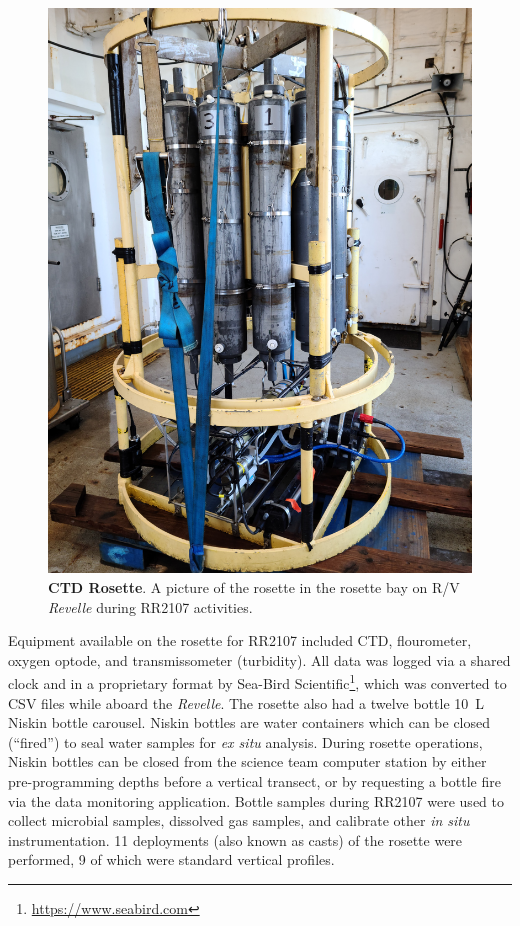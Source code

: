 \begin{figure}[h!]
  \centering
  \includegraphics[width=0.8\columnwidth, angle=-90]{figures/ops_rosette.jpg}
  \caption[CTD Rosette]{\textbf{CTD Rosette}. A picture of the rosette in the rosette bay on R/V \emph{Revelle} during RR2107 activities.}
  \label{fig:ops_rosette}
\end{figure}


Equipment available on the rosette for RR2107 included CTD, flourometer, oxygen optode, and transmissometer (turbidity). All data was logged via a shared clock and in a proprietary format by Sea-Bird Scientific\footnote{\url{https://www.seabird.com}}, which was converted to CSV files while aboard the \emph{Revelle}. The rosette also had a twelve bottle \SI{10}{\liter} Niskin bottle carousel. Niskin bottles are water containers which can be closed (``fired'') to seal water samples for \emph{ex situ} analysis. During rosette operations, Niskin bottles can be closed from the science team computer station by either pre-programming depths before a vertical transect, or by requesting a bottle fire via the data monitoring application. Bottle samples during RR2107 were used to collect microbial samples, dissolved gas samples, and calibrate other \emph{in situ} instrumentation. 11 deployments (also known as casts) of the rosette were performed, 9 of which were standard vertical profiles. 

